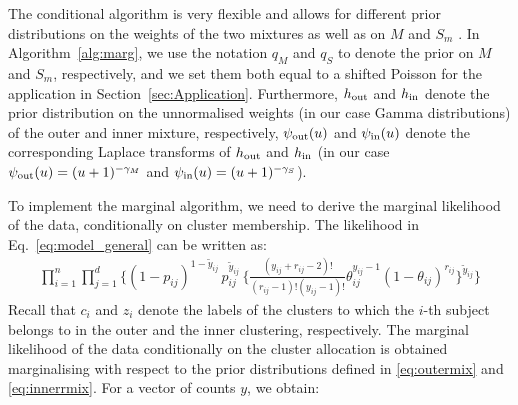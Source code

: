 \documentclass[11pt]{article}
\begin{document}
The conditional algorithm is very flexible and allows for different prior distributions on the weights of the two mixtures as well as on $M$ and $S_m$ \citep[see][for details]{Argiento2022}. In Algorithm~\ref{alg:marg}, we use the notation $q_M$ and $q_S$ to denote the prior on $M$ and $S_m$, respectively, and we set them both equal to a shifted Poisson for the application in Section~\ref{sec:Application}. Furthermore, $h_{\textnormal{out}}$ and $h_{\textnormal{in}}$ denote the prior distribution on the unnormalised weights (in our case Gamma distributions) of the outer and inner mixture, respectively, $\psi_{\textnormal{out}}(u)$ and $\psi_{\textnormal{in}}(u)$ denote the corresponding Laplace transforms of $h_{\textnormal{out}}$ and $h_{\textnormal{in}}$ (in our case $\psi_{\textnormal{out}}(u) = (u + 1)^{-\gamma_M}$ and $\psi_{\textnormal{in}}(u) = (u + 1)^{-\gamma_S}$). 

To implement the marginal algorithm, we need to  derive the marginal likelihood of the data, conditionally on  cluster membership. The likelihood in Eq.~\eqref{eq:model_general} can be written as:
\begin{equation}\label{eq:1+2}
\begin{aligned}
	\prod_{i=1}^n \prod\limits_{j=1}^d 
	\Bigg\{\left(1-p_{ij}\right)^{1 - \widetilde{y}_{ij}} \, p_{ij}^{\widetilde{y}_{ij}}\,
	\bigg\{ \frac{\left(y_{ij} + r_{ij} - 2\right)!}{\left(r_{ij}-1\right)!\left(y_{ij}-1\right)!}
	\theta_{ij} ^{y_{ij}-1} \left(1-\theta_{ij}\right)^{r_{ij}} \bigg\}^{\widetilde{y}_{ij}}\Bigg\}
\end{aligned}
\end{equation}
Recall that $c_i$ and $z_i$ denote the labels of the clusters to which the $i$-th subject belongs to in the outer and the inner clustering, respectively. The marginal likelihood of the data conditionally on the cluster allocation is obtained marginalising with respect to the prior distributions defined in \eqref{eq:outermix} and \eqref{eq:innerrmix}. For a vector of counts $y$, we obtain: 
\end{document}
